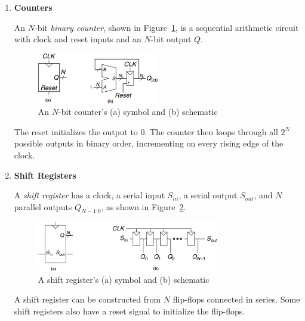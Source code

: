 \documentclass[12pt]{article}
\numberwithin{figure}{subsection}
\numberwithin{table}{subsection}
\numberwithin{equation}{subsection}
\begin{document}
\begin{enumerate}
  \item \textbf{Counters}

  An $N$-bit \textit{binary counter}, shown in Figure~\ref{fig:n_bit_counter_symbol_schematic}, is a sequential arithmetic circuit with clock and reset inputs and an $N$-bit output $Q$.

  \begin{figure}[ht]
    \centering
    \includegraphics[width=0.5\textwidth]{counter_symbol_schematic_n_bits.png}
    \caption{An $N$-bit counter's (a) symbol and (b) schematic}
    \label{fig:n_bit_counter_symbol_schematic}
  \end{figure}

  The reset initializes the output to 0. The counter then loops through all $2^N$ possible outputs in binary order, incrementing on every rising edge of the clock.

  \item \textbf{Shift Registers}

  A \textit{shift register} has a clock, a serial input $S_{in}$, a serial output $S_{out}$, and $N$ parallel outputs $Q_{N - 1 \text{:} 0}$, as shown in Figure~\ref{fig:shift_register_symbol_schematic}.

  \begin{figure}[ht]
    \centering
    \includegraphics[width=0.75\textwidth]{shift_register_symbol_schematic.png}
    \caption{A shift register's (a) symbol and (b) schematic}
    \label{fig:shift_register_symbol_schematic}
  \end{figure}

  A shift register can be constructed from $N$ flip-flops connected in series. Some shift registers also have a reset signal to initialize the flip-flops.
\end{enumerate}
\end{document}
